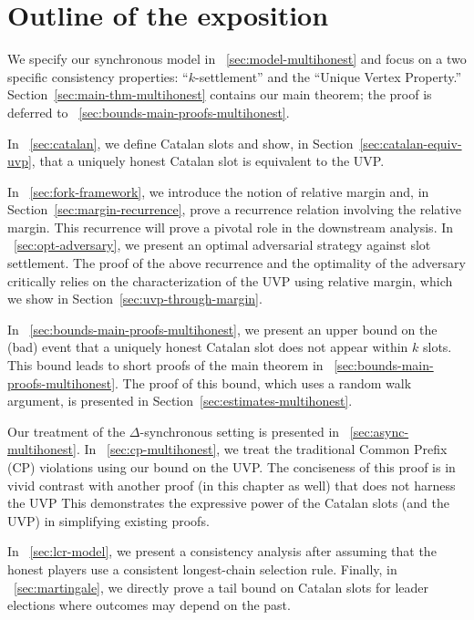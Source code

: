 \section{Outline of the exposition}
We specify our synchronous model in \Section~\ref{sec:model-multihonest} and 
focus on a
two specific consistency properties: ``$k$-settlement'' and the ``Unique Vertex Property.''
Section~\ref{sec:main-thm-multihonest} 
contains our main theorem; the proof is deferred to
\Section~\ref{sec:bounds-main-proofs-multihonest}. 

In \Section~\ref{sec:catalan}, we define Catalan slots and 
show, in Section~\ref{sec:catalan-equiv-uvp}, 
that a uniquely honest Catalan slot is equivalent to the UVP. 

In \Section~\ref{sec:fork-framework}, 
we introduce the notion of relative margin and, 
in Section~\ref{sec:margin-recurrence}, 
prove a recurrence relation involving the relative margin. 
This recurrence will prove a pivotal role in the downstream analysis.
In \Section~\ref{sec:opt-adversary}, we 
present an optimal adversarial strategy against slot settlement. 
The proof of the above recurrence and the optimality of the adversary 
critically relies on 
the characterization of the UVP using relative margin,  
which we show in Section~\ref{sec:uvp-through-margin}. 


In \Section~\ref{sec:bounds-main-proofs-multihonest},
we present an upper bound on the (bad) event that
a uniquely honest Catalan slot does not appear within $k$ slots. 
This bound leads to short proofs of the
main theorem in \Section~\ref{sec:bounds-main-proofs-multihonest}. 
The proof of this bound, 
which uses a random walk argument, 
is presented in
Section~\ref{sec:estimates-multihonest}.

Our treatment of the $\Delta$-synchronous setting is
presented in \Section~\ref{sec:async-multihonest}.  
In \Section~\ref{sec:cp-multihonest}, we
treat the traditional Common Prefix (CP) violations using our bound
on the UVP. 
The conciseness of this proof is in vivid contrast with 
another proof (in this chapter as well) 
that does not harness the UVP
This demonstrates the expressive power of the Catalan slots (and the UVP) 
in simplifying existing proofs.

In \Section~\ref{sec:lcr-model}, 
we present a consistency analysis 
after assuming that the honest players use a consistent 
longest-chain selection rule.
Finally, in \Section~\ref{sec:martingale}, 
we directly prove a tail bound on Catalan slots 
for leader elections where 
outcomes may depend on the past.


